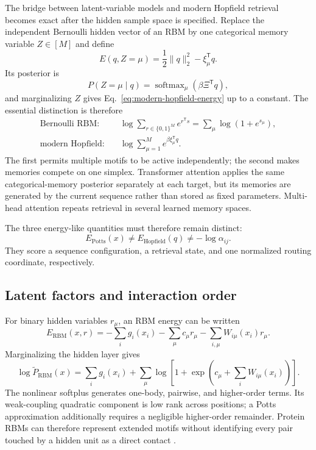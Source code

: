 \documentclass[10pt]{article}
\theoremstyle{definition}
\theoremstyle{remark}
\newcommand{\BookSection}[1]{\subsection{#1}}
\begin{document}
The bridge between latent-variable models and modern Hopfield retrieval becomes exact after the
hidden sample space is specified.  Replace the independent Bernoulli hidden vector of an RBM by one
categorical memory variable $Z\in[M]$ and define
\begin{equation}
E(q,Z=\mu)=\frac12\|q\|_2^2-\xi_\mu^{\mathsf T}q.
\label{eq:categorical-memory-energy}
\end{equation}
Its posterior is
\begin{equation}
P(Z=\mu\mid q)
=\operatorname{softmax}_{\mu}(\beta\Xi^{\mathsf T}q),
\label{eq:categorical-memory-posterior}
\end{equation}
and marginalizing $Z$ gives Eq.~\ref{eq:modern-hopfield-energy} up to a constant.  The essential
distinction is therefore
\begin{equation}
\boxed{
\begin{aligned}
\text{Bernoulli RBM:}&\quad
\log\sum_{r\in\{0,1\}^M}e^{r^{\mathsf T}s}
=\sum_\mu\log(1+e^{s_\mu}),\\
\text{modern Hopfield:}&\quad
\log\sum_{\mu=1}^M e^{\beta\xi_\mu^{\mathsf T}q}.
\end{aligned}}
\label{eq:hidden-sample-spaces}
\end{equation}
The first permits multiple motifs to be active independently; the second makes memories compete on
one simplex.  Transformer attention applies the same categorical-memory posterior separately at
each target, but its memories are generated by the current sequence rather than stored as fixed
parameters.  Multi-head attention repeats retrieval in several learned memory spaces.

The three energy-like quantities must therefore remain distinct:
\begin{equation}
\boxed{
E_{\mathrm{Potts}}(x)
\ne E_{\mathrm{Hopfield}}(q)
\ne-\log\alpha_{ij}.}
\label{eq:three-energies}
\end{equation}
They score a sequence configuration, a retrieval state, and one normalized routing coordinate,
respectively.

\BookSection{Latent factors and interaction order}

For binary hidden variables $r_\mu$, an RBM energy can be written
\begin{equation}
E_{\mathrm{RBM}}(x,r)
=-\sum_i g_i(x_i)-\sum_\mu c_\mu r_\mu
-\sum_{i,\mu}W_{i\mu}(x_i)r_\mu.
\end{equation}
Marginalizing the hidden layer gives
\begin{equation}
\log\widetilde P_{\mathrm{RBM}}(x)
=\sum_i g_i(x_i)
+\sum_\mu\log\left[1+\exp\left(c_\mu+\sum_iW_{i\mu}(x_i)\right)\right].
\label{eq:rbm-marginal}
\end{equation}
The nonlinear softplus generates one-body, pairwise, and higher-order terms.  Its weak-coupling
quadratic component is low rank across positions; a Potts approximation additionally requires a
negligible higher-order remainder.  Protein RBMs can therefore represent extended
motifs without identifying every pair touched by a hidden unit as a direct contact
\cite{hinton2002,tubiana2019}.
\end{document}
